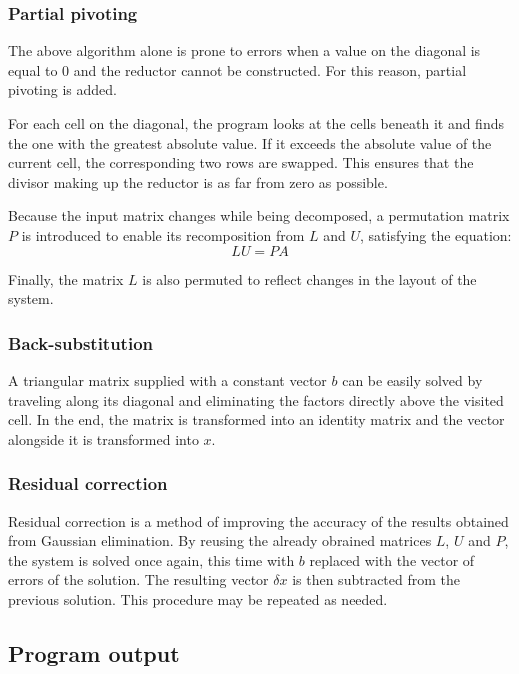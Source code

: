 \documentclass{article}
\begin{document}
	\subsubsection{Partial pivoting}

	The above algorithm alone is prone to errors when a value on the diagonal is
	equal to $0$ and the reductor cannot be constructed. For this reason,
	partial pivoting is added.

	For each cell on the diagonal, the program looks at the cells beneath it and
	finds the one with the greatest absolute value. If it exceeds the absolute
	value of the current cell, the corresponding two rows are swapped. This
	ensures that the divisor making up the reductor is as far from zero as
	possible.

	Because the input matrix changes while being decomposed, a permutation
	matrix $P$ is introduced to enable its recomposition from $L$ and $U$,
	satisfying the equation:
	\begin{equation}
		LU = PA
	\end{equation}

	Finally, the matrix $L$ is also permuted to reflect changes in the layout
	of the system.

	\subsubsection{Back-substitution}

	A triangular matrix supplied with a constant vector $b$ can be easily solved
	by traveling along its diagonal and eliminating the factors directly above
	the visited cell. In the end, the matrix is transformed into an identity
	matrix and the vector alongside it is transformed into $x$.

	\subsubsection{Residual correction}

	Residual correction is a method of improving the accuracy of the results
	obtained from Gaussian elimination. By reusing the already obrained matrices
	$L$, $U$ and $P$, the system is solved once again, this time with $b$
	replaced with the vector of errors of the solution. The resulting vector
	$\delta x$ is then subtracted from the previous solution. This procedure may
	be repeated as needed.

	\subsection{Program output}
\end{document}
